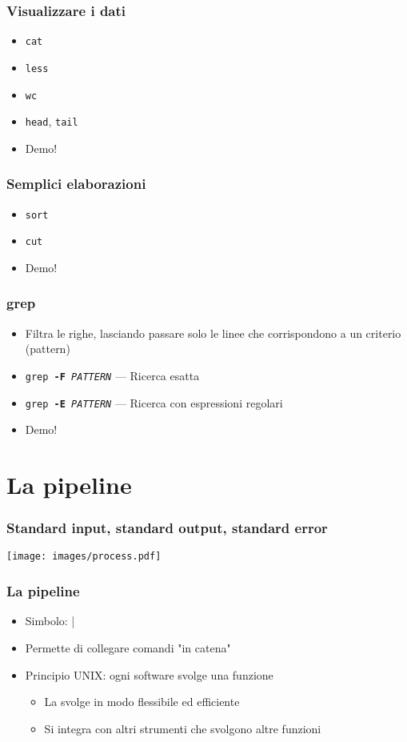 \documentclass[xetex,table]{beamer}
\begin{document}
\begin{frame}
  \frametitle{Visualizzare i dati}
  \begin{itemize}
  \item \texttt{cat}
  \item \texttt{less}
  \item \texttt{wc}
  \item \texttt{head}, \texttt{tail}
  \item Demo!
  \end{itemize}
\end{frame}

\begin{frame}
  \frametitle{Semplici elaborazioni}
  \begin{itemize}
  \item \texttt{sort}
  \item \texttt{cut}
  \item Demo!
  \end{itemize}
\end{frame}

\begin{frame}
  \frametitle{grep}
  \begin{itemize}
  \item Filtra le righe, lasciando passare solo le linee che
    corrispondono a un criterio (pattern)
  \item \texttt{grep {\bf -F} \emph{PATTERN}} --- Ricerca esatta
  \item \texttt{grep {\bf -E} \emph{PATTERN}} --- Ricerca con espressioni regolari
  \item Demo!
  \end{itemize}
\end{frame}

\section{La pipeline}

\begin{frame}
  \frametitle{Standard input, standard output, standard error}
  \begin{center}
    \texttt{[image: images/process.pdf]}
  \end{center}
\end{frame}

\begin{frame}
  \frametitle{La pipeline}
  \begin{itemize}
  \item Simbolo: |
  \item Permette di collegare comandi "in catena"
  \item Principio UNIX: ogni software svolge una funzione
    \begin{itemize}
    \item La svolge in modo flessibile ed efficiente
    \item Si integra con altri strumenti che svolgono altre funzioni
    \end{itemize}
  \end{itemize}
\end{frame}
\end{document}
